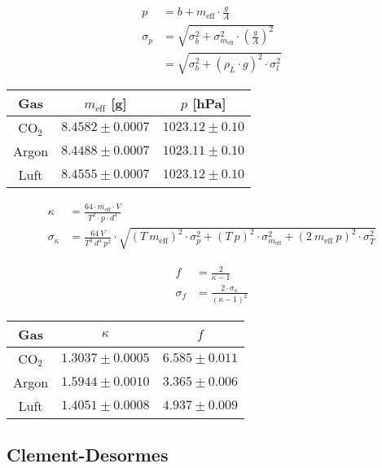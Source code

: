 \documentclass[12pt,a4paper,titlepage,headinclude,bibtotoc]{scrartcl}
\begin{document}
\begin{align}
	p &= b + m_{\text{eff}} \cdot \frac{g}{A}\\
	\sigma_p &= \sqrt{\sigma_b^2+\sigma_{m_{\text{eff}}}^2 \cdot \left(\frac{g}{A}\right)^2}\\
	&=\sqrt{\sigma_b^2+\left(\rho_L \cdot g\right)^2 \cdot \sigma_l^2 }
\end{align}

\begin{table}[!hbt]
	\centering
	\begin{tabular}{|c|c|c|}
		\hline
		Gas & $m_{\text{eff}}$ [g] & $p$ [hPa] \\
		\hline
		\hline
		CO$_2$ & $8.4582 \pm 0.0007$ & $1023.12 \pm 0.10$ \\
		Argon & $8.4488 \pm 0.0007$ & $1023.11 \pm 0.10$ \\
		Luft & $8.4555 \pm 0.0007$ & $1023.12 \pm 0.10$ \\
		\hline
	\end{tabular}
\end{table}


\begin{align}
	\kappa&=\frac{64 \cdot m_{\text{eff}}\cdot V }{T^{2} \cdot p \cdot d^{4}}\\
	\sigma_{\kappa}&=\frac{64 ~ V}{T^{3} ~ d^{4} ~ p^{2}} \cdot \sqrt{\left(T ~ m_{\text{eff}}\right)^2 \cdot \sigma_{p}^{2} + \left(T ~ p\right)^2 \cdot \sigma_{m_{\text{eff}}}^{2} + \left(2~m_{\text{eff}}~p\right)^{2} \cdot \sigma_{T}^{2}}
\end{align}

\begin{align}
	f&=\frac{2}{\kappa - 1}\\
	\sigma_{f}&=\frac{2 \cdot \sigma_{\kappa}}{\left(\kappa - 1\right)^{2}}
\end{align}

\begin{table}[!hbt]
	\centering
	\begin{tabular}{|c|c|c|}
		\hline
		Gas & $\kappa$ & $f$\\
		\hline
		\hline		
		CO$_2$ & $1.3037 \pm 0.0005$ & $6.585 \pm 0.011$ \\
		Argon & $1.5944 \pm 0.0010$ & $3.365 \pm 0.006$ \\
		Luft & $1.4051 \pm 0.0008$ & $4.937 \pm 0.009$ \\		
		\hline
	\end{tabular}
\end{table}


\subsection{Clement-Desormes}
\end{document}
